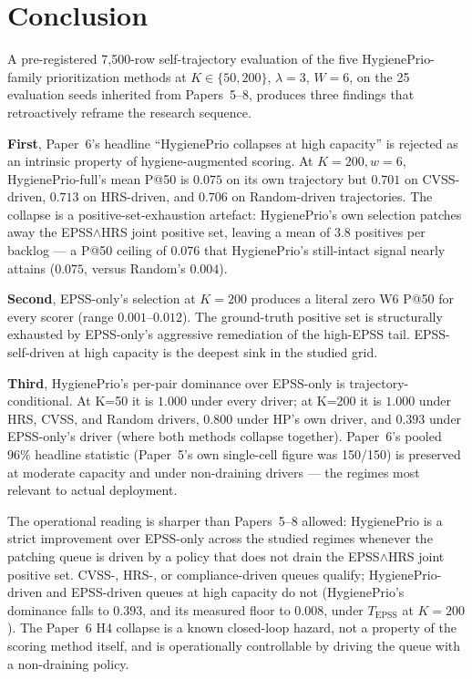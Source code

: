\section{Conclusion}
\label{sec:conclusion}

A pre-registered 7{,}500-row self-trajectory evaluation of the five
HygienePrio-family prioritization methods at $K \in \{50, 200\}$,
$\lambda = 3$, $W = 6$, on the 25 evaluation seeds inherited from
Papers~5--8, produces three findings that retroactively reframe the
research sequence.

\textbf{First}, Paper~6's headline ``HygienePrio collapses at high
capacity'' is rejected as an intrinsic property of hygiene-augmented
scoring. At $K = 200, w = 6$, HygienePrio-full's mean P@50 is $0.075$
on its own trajectory but $0.701$ on CVSS-driven, $0.713$ on
HRS-driven, and $0.706$ on Random-driven trajectories. The collapse
is a positive-set-exhaustion artefact: HygienePrio's own selection
patches away the EPSS$\wedge$HRS joint positive set, leaving a mean
of $3.8$ positives per backlog --- a P@50 ceiling of $0.076$ that
HygienePrio's still-intact signal nearly attains ($0.075$, versus
Random's $0.004$).

\textbf{Second}, EPSS-only's selection at $K = 200$ produces a literal
zero W6 P@50 for every scorer (range $0.001$--$0.012$). The
ground-truth positive set is structurally exhausted by EPSS-only's
aggressive remediation of the high-EPSS tail. EPSS-self-driven at
high capacity is the deepest sink in the studied grid.

\textbf{Third}, HygienePrio's per-pair dominance over EPSS-only is
trajectory-conditional. At K=50 it is $1.000$ under every driver;
at K=200 it is $1.000$ under HRS, CVSS, and Random drivers, $0.800$
under HP's own driver, and $0.393$ under EPSS-only's driver
(where both methods collapse together). Paper~6's pooled $96\%$
headline statistic (Paper~5's own single-cell figure was 150/150) is
preserved at moderate capacity and under non-draining
drivers --- the regimes most relevant to actual deployment.

The operational reading is sharper than Papers~5--8 allowed:
HygienePrio is a strict improvement over EPSS-only across the
studied regimes whenever the patching queue is driven by a policy
that does not drain the EPSS$\wedge$HRS joint positive set. CVSS-,
HRS-, or compliance-driven queues qualify; HygienePrio-driven and
EPSS-driven queues at high capacity do not (HygienePrio's dominance
falls to $0.393$, and its measured floor to $0.008$, under
$T_{\mathrm{EPSS}}$ at $K = 200$). The Paper~6 H4 collapse is a known
closed-loop hazard, not a property of the scoring method itself, and
is operationally controllable by driving the queue with a
non-draining policy.

